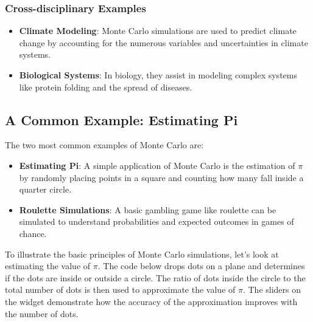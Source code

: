 \subsubsection{Cross-disciplinary
Examples}\label{cross-disciplinary-examples}

\begin{itemize}
\tightlist
\item
  \textbf{Climate Modeling}: Monte Carlo simulations are used to predict
  climate change by accounting for the numerous variables and
  uncertainties in climate systems.
\item
  \textbf{Biological Systems}: In biology, they assist in modeling
  complex systems like protein folding and the spread of diseases.
\end{itemize}

\subsection{A Common Example: Estimating
Pi}\label{a-common-example-estimating-pi}

The two most common examples of Monte Carlo are:

\begin{itemize}
\tightlist
\item
  \textbf{Estimating Pi}: A simple application of Monte Carlo is the
  estimation of \(\pi\) by randomly placing points in a square and
  counting how many fall inside a quarter circle.
\item
  \textbf{Roulette Simulations}: A basic gambling game like roulette can
  be simulated to understand probabilities and expected outcomes in
  games of chance.
\end{itemize}

To illustrate the basic principles of Monte Carlo simulations, let's
look at estimating the value of \(\pi\). The code below drops dots on a
plane and determines if the dots are inside or outside a circle. The
ratio of dots inside the circle to the total number of dots is then used
to approximate the value of \(\pi\). The sliders on the widget
demonstrate how the accuracy of the approximation improves with the
number of dots.

\begin{Shaded}
\begin{Highlighting}[]
\end{Highlighting}
\end{Shaded}

